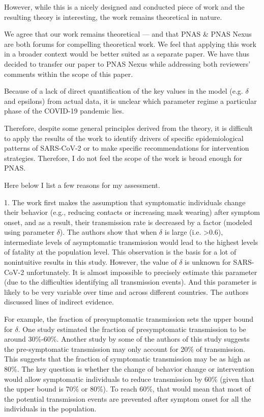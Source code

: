 \documentclass[12pt]{article}
\newcommand{\revtext}{\textsf}
\begin{document}
\revtext{However, while this is a nicely designed and conducted piece of work and the resulting theory is interesting, the work remains theoretical in nature.}

We agree that our work remains theoretical --- and that PNAS \& PNAS Nexus are both forums for compelling theoretical work. We feel that applying this work in a broader context would be better suited as a separate paper. We have thus decided to transfer our paper to PNAS Nexus while addressing both reviewers' comments within the scope of this paper.

\revtext{Because of a lack of direct quantification of the key values in the model (e.g. $\delta$ and epsilons) from actual data, it is unclear which parameter regime a particular phase of the COVID-19 pandemic lies.}

\revtext{Therefore, despite some general principles derived from the theory, it is difficult to apply the results of the work to identify drivers of specific epidemiological patterns of SARS-CoV-2 or to make specific recommendations for intervention strategies. Therefore, I do not feel the scope of the work is broad enough for PNAS.}

\revtext{Here below I list a few reasons for my assessment.}

\revtext{1. The work first makes the assumption that symptomatic individuals change their behavior (e.g., reducing contacts or increasing mask wearing) after symptom onset, and as a result, their transmission rate is decreased by a factor (modeled using parameter $\delta$). The authors show that when $\delta$ is large (i.e. >0.6), intermediate levels of asymptomatic transmission would lead to the highest levels of fatality at the population level. This observation is the basis for a lot of nonintuitive results in this study. However, the value of $\delta$ is unknown for SARS-CoV-2 unfortunately. It is almost impossible to precisely estimate this parameter (due to the difficulties identifying all transmission events). And this parameter is likely to be very variable over time and across different countries. The authors discussed lines of indirect evidence.}

\revtext{For example, the fraction of presymptomatic transmission sets the upper bound for $\delta$. One study estimated the fraction of presymptomatic transmission to be around 30\%-60\%. Another study by some of the authors of this study suggests the pre-symptomatic transmission may only account for 20\% of transmission. This suggests that the fraction of symptomatic transmission may be as high as 80\%. The key question is whether the change of behavior change or intervention would allow symptomatic individuals to reduce transmission by 60\% (given that the upper bound is 70\% or 80\%). To reach 60\%, that would mean that most of the potential transmission events are prevented after symptom onset for all the individuals in the population.}
\end{document}

